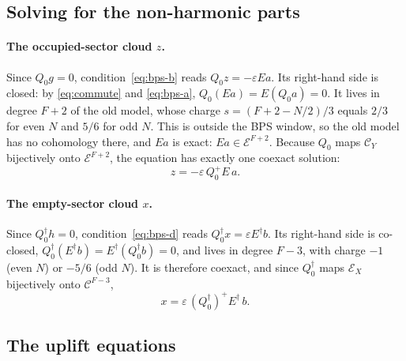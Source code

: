 \documentclass[11pt]{article}
\newcommand{\eps}{\varepsilon}
\newcommand{\Ec}{\mathcal E}
\newcommand{\Cc}{\mathcal C}
\theoremstyle{plain}
\theoremstyle{remark}
\numberwithin{equation}{section}
\begin{document}
\subsection{Solving for the non-harmonic parts}

\paragraph{The occupied-sector cloud $z$.} Since $Q_0g=0$, condition~\eqref{eq:bps-b} reads $Q_0z=-\eps Ea$. Its
right-hand side is closed: by \eqref{eq:commute} and \eqref{eq:bps-a}, $Q_0(Ea)=E(Q_0a)=0$. It lives in degree $F+2$ of
the old model, whose charge $s=(F+2-N/2)/3$ equals $2/3$ for even $N$ and $5/6$ for odd $N$. This is outside the BPS
window, so the old model has no cohomology there, and $Ea$ is exact: $Ea\in\Ec^{F+2}$. Because $Q_0$ maps $\Cc_Y$
bijectively onto $\Ec^{F+2}$, the equation has exactly one coexact solution:
\begin{equation}\label{eq:z}
z=-\eps\,Q_0^+E\,a .
\end{equation}

\paragraph{The empty-sector cloud $x$.} Since $Q_0^\dagger h=0$, condition~\eqref{eq:bps-d} reads
$Q_0^\dagger x=\eps E^\dagger b$. Its right-hand side is co-closed, $Q_0^\dagger(E^\dagger b)=E^\dagger(Q_0^\dagger b)=0$,
and lives in degree $F-3$, with charge $-1$ (even $N$) or $-5/6$ (odd $N$). It is therefore coexact, and since
$Q_0^\dagger$ maps $\Ec_X$ bijectively onto $\Cc^{F-3}$,
\begin{equation}\label{eq:x}
x=\eps\,(Q_0^\dagger)^+E^\dagger\, b .
\end{equation}

\subsection{The uplift equations}
\end{document}
